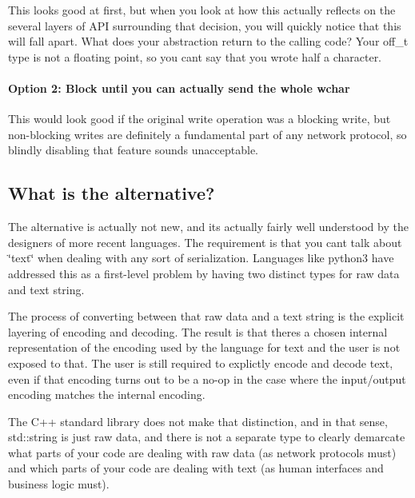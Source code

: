This looks good at first, but when you look at how this actually reflects on the several layers of A\+PI surrounding that decision, you will quickly notice that this will fall apart. What does your abstraction return to the calling code? Your off\+\_\+t type is not a floating point, so you can\textquotesingle{}t say that you wrote half a character.

\paragraph*{Option 2\+: Block until you can actually send the whole wchar}

This would look good if the original write operation was a blocking write, but non-\/blocking writes are definitely a fundamental part of any network protocol, so blindly disabling that feature sounds unacceptable.

\subsection*{What is the alternative?}

The alternative is actually not new, and it\textquotesingle{}s actually fairly well understood by the designers of more recent languages. The requirement is that you can\textquotesingle{}t talk about \char`\"{}text\char`\"{} when dealing with any sort of serialization. Languages like python3 have addressed this as a first-\/level problem by having two distinct types for \textquotesingle{}raw data\textquotesingle{} and \textquotesingle{}text string\textquotesingle{}.

The process of converting between that \textquotesingle{}raw data\textquotesingle{} and a \textquotesingle{}text string\textquotesingle{} is the explicit layering of encoding and decoding. The result is that there\textquotesingle{}s a chosen internal representation of the encoding used by the language for \textquotesingle{}text\textquotesingle{} and the user is not exposed to that. The user is still required to explictly encode and decode text, even if that encoding turns out to be a no-\/op in the case where the input/output encoding matches the internal encoding.

The C++ standard library does not make that distinction, and in that sense, std\+::string is just \textquotesingle{}raw data\textquotesingle{}, and there is not a separate type to clearly demarcate what parts of your code are dealing with raw data (as network protocols must) and which parts of your code are dealing with text (as human interfaces and business logic must).

